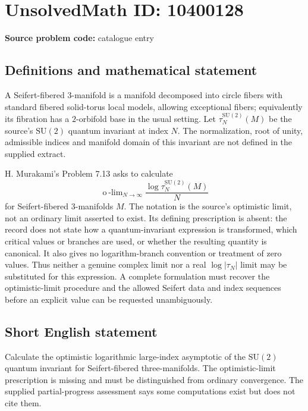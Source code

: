 \documentclass[11pt]{article}
\begin{document}
\section*{UnsolvedMath ID: 10400128}
\textbf{Source problem code:} catalogue entry
\subsection{Definitions and mathematical statement}
A Seifert-fibered \(3\)-manifold is a manifold decomposed into circle fibers with standard fibered solid-torus local models, allowing exceptional fibers; equivalently its fibration has a \(2\)-orbifold base in the usual setting. Let \(\tau_N^{\mathrm{SU}(2)}(M)\) be the source's \(\mathrm{SU}(2)\) quantum invariant at index \(N\). The normalization, root of unity, admissible indices and manifold domain of this invariant are not defined in the supplied extract.

H. Murakami's Problem 7.13 asks to calculate
\[
 \operatorname{o\!\!-lim}_{N\to\infty}
       \frac{\log\tau_N^{\mathrm{SU}(2)}(M)}{N}
\]
for Seifert-fibered \(3\)-manifolds \(M\). The notation is the source's optimistic limit, not an ordinary limit asserted to exist. Its defining prescription is absent: the record does not state how a quantum-invariant expression is transformed, which critical values or branches are used, or whether the resulting quantity is canonical. It also gives no logarithm-branch convention or treatment of zero values. Thus neither a genuine complex limit nor a real \(\log|\tau_N|\) limit may be substituted for this expression. A complete formulation must recover the optimistic-limit procedure and the allowed Seifert data and index sequences before an explicit value can be requested unambiguously.
\subsection{Short English statement}
Calculate the optimistic logarithmic large-index asymptotic of the \(\mathrm{SU}(2)\) quantum invariant for Seifert-fibered three-manifolds. The optimistic-limit prescription is missing and must be distinguished from ordinary convergence. The supplied partial-progress assessment says some computations exist but does not cite them.
\end{document}
